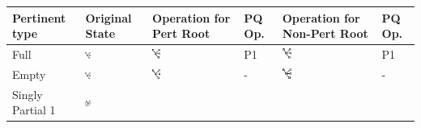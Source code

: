 \documentclass[a4]{jgaa-art}
\begin{document}
\begin{appendices}
\begin{table}[h]
  \def\arraystretch{1}
  \centering
  \begin{tabular}
      {|C{0.22\textwidth}|C{0.14\textwidth}|C{0.14\textwidth}|C{0.05\textwidth}|C{0.14\textwidth}|C{0.05\textwidth}|}
      \hline 
      Pertinent type & Original State & Operation for Pert Root & PQ Op. & Operation for Non-Pert Root & PQ Op.\\
      \hline
      Full&
      \includegraphics[width=0.1\textwidth]{bc_transform_cv_01_before} &
      \includegraphics[width=0.1\textwidth]{bc_transform_cv_01_root} &
      P1 &
      \includegraphics[width=0.1\textwidth]{bc_transform_cv_01_nonroot} &
      P1 \\
      \hline
      Empty &
      \includegraphics[width=0.1\textwidth]{bc_transform_cv_11_before} &
      \includegraphics[width=0.1\textwidth]{bc_transform_cv_11_root} &
      - &
      \includegraphics[width=0.1\textwidth]{bc_transform_cv_11_nonroot} &
      - \\
      \hline
      Singly Partial 1&
      \includegraphics[width=0.1\textwidth]{bc_transform_cv_02_before} &

\end{tabular}
\end{table}
\end{appendices}
\end{document}
